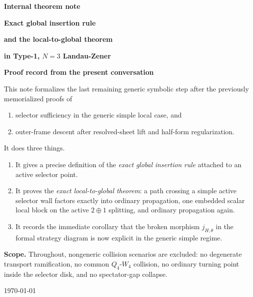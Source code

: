 \documentclass[11pt]{article}
\numberwithin{equation}{section}
\theoremstyle{definition}
\begin{document}
\begin{titlepage}
\thispagestyle{empty}
\centering
\vspace*{1.0cm}

{\Large\color{AccentBlue}\bfseries Internal theorem note\par}
\vspace{0.7cm}

{\fontsize{24}{28}\selectfont\bfseries\color{TitleBlue}Exact global insertion rule\par}
\vspace{0.15cm}
{\fontsize{19}{23}\selectfont\bfseries\color{TitleBlue}and the local-to-global theorem\par}
\vspace{0.15cm}
{\fontsize{18}{22}\selectfont\bfseries\color{TitleBlue}in Type-1, $N=3$ Landau-Zener\par}
\vspace{0.3cm}
{\Large\color{AccentBlue}\bfseries Proof record from the present conversation\par}

\vspace{0.95cm}

\begin{minipage}{0.90\textwidth}
\small
This note formalizes the last remaining generic symbolic step after the previously memorialized proofs of
\begin{enumerate}
  \item selector sufficiency in the generic simple local case, and
  \item outer-frame descent after resolved-sheet lift and half-form regularization.
\end{enumerate}
It does three things.
\begin{enumerate}
  \item It gives a precise definition of the \emph{exact global insertion rule} attached to an active selector point.
  \item It proves the \emph{exact local-to-global theorem}: a path crossing a simple active selector wall factors exactly into ordinary propagation, one embedded scalar local block on the active $2\oplus 1$ splitting, and ordinary propagation again.
  \item It records the immediate corollary that the broken morphism $j_{H,\theta}$ in the formal strategy diagram is now explicit in the generic simple regime.
\end{enumerate}

\medskip
\textbf{Scope.} Throughout, nongeneric collision scenarios are excluded: no degenerate transport ramification, no common $Q_4$-$W_4$ collision, no ordinary turning point inside the selector disk, and no spectator-gap collapse.
\end{minipage}

\vfill

{\large\color{MutedText}\today\par}
\end{titlepage}
\end{document}
